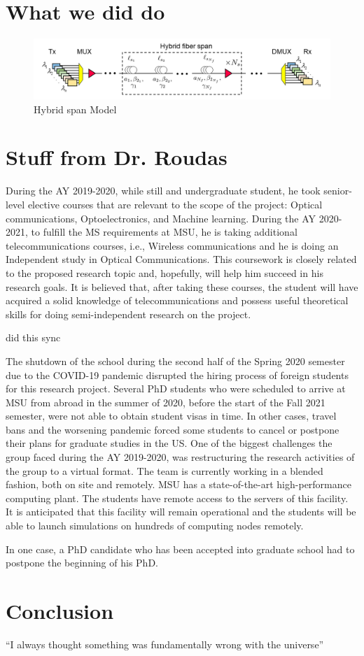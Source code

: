 \documentclass{report}
\begin{document}
\section{What we did do}

\begin{figure}[h!]
\centering
\includegraphics[scale=0.4]{BlockDiagramHybridFiberSpans_Nf.png}
\caption{Hybrid span Model}
\label{fig:hybrid_spans}
\end{figure}

\section{Stuff from Dr. Roudas}
During the AY 2019-2020, while still and undergraduate student, he took senior-level elective courses that are relevant to the scope of the project: Optical communications, Optoelectronics, and Machine learning. During the AY 2020-2021, to fulfill the MS requirements at MSU, he is taking additional telecommunications courses, i.e., Wireless communications and he is doing an Independent study in Optical Communications. This coursework is closely related to the proposed research topic and, hopefully, will help him succeed in his research goals. It is believed that, after taking these courses, the student will have acquired a solid knowledge of telecommunications and possess useful theoretical skills for doing semi-independent research on the project.

did this sync

The shutdown of the school during the second half of the Spring 2020 semester due to the COVID-19 pandemic disrupted the hiring process of foreign students for this research project. Several PhD students who were scheduled to arrive at MSU from abroad in the summer of 2020, before the start of the Fall 2021 semester, were not able to obtain student visas in time. In other cases, travel bans and the worsening pandemic forced some students to cancel or postpone their plans for graduate studies in the US. 
One of the biggest challenges the group faced during the AY 2019-2020, was restructuring the research activities of the group to a virtual format. The team is currently working in a blended fashion, both on site and remotely. MSU has a state-of-the-art high-performance computing plant. The students have remote access to the servers of this facility. It is anticipated that this facility will remain operational and the students will be able to launch simulations on hundreds of computing nodes remotely.
 
In one case, a PhD candidate who has been accepted into graduate school had to postpone the beginning of his PhD.

\section{Conclusion}
``I always thought something was fundamentally wrong with the universe'' \citep{adams1995hitchhiker}



\end{document}
